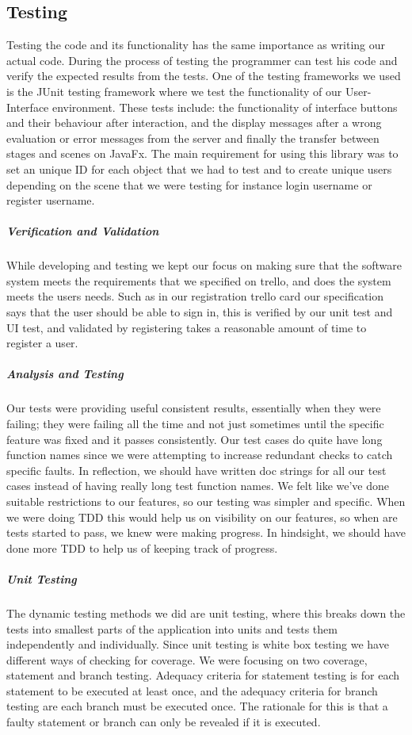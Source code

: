 \documentclass[11pt,a4paper]{report}
\begin{document}
\subsection{Testing}
Testing the code and its functionality has the same importance as writing our actual code. During the process of testing the programmer can test his code and verify the expected results from the tests. One of the testing frameworks we used is the JUnit testing framework where we test the functionality of our User-Interface environment. These tests include: the functionality of interface buttons and their behaviour after interaction, and the display messages after a wrong evaluation or error messages from the server and finally the transfer between stages and scenes on JavaFx. The main requirement for using this library was to set an unique ID for each object that we had to test and to create unique users depending on the scene that we were testing for instance login username or register username.

\subparagraph{Verification and Validation}
While developing and testing we kept our focus on making sure that the software system meets the requirements that we specified on trello, and does the system meets the users needs. Such as in our registration trello card our specification says that the user should be able to sign in, this is verified by our unit test and UI test, and validated by registering takes a reasonable amount of time to register a user.

\subparagraph{Analysis and Testing}
Our tests were providing useful consistent results, essentially when they were failing; they were failing all the time and not just sometimes until the specific feature was fixed and it passes consistently. Our test cases do quite have long function names since we were attempting to increase redundant checks to catch specific faults. In reflection, we should have written doc strings for all our test cases instead of having really long test function names. We felt like we’ve done suitable restrictions to our features, so our testing was simpler and specific. When we were doing TDD this would help us on visibility on our features, so when are tests started to pass, we knew were making progress. In hindsight, we should have done more TDD to help us of keeping track of progress.


\subparagraph{Unit Testing} The dynamic testing methods we did are unit testing, where this breaks down the tests into smallest parts of the application into units and tests them independently and individually. Since unit testing is white box testing we have different ways of checking for coverage. We were focusing on two coverage, statement and branch testing. Adequacy criteria for statement testing is for each statement to be executed at least once, and the adequacy criteria for branch testing are each branch must be executed once. The rationale for this is that a faulty statement or branch can only be revealed if it is executed.
\end{document}
